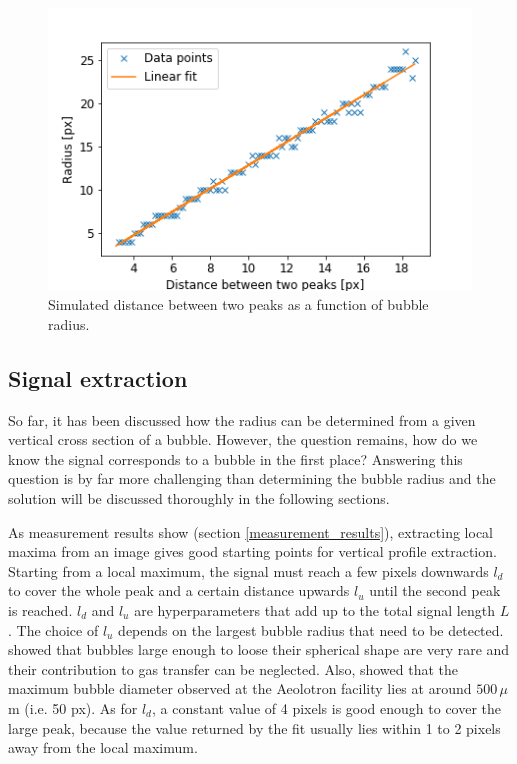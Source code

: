 		\begin{figure}
			\centering
			\includegraphics[scale=.6]{graphs/peak_distance_radius_fit.png}
			\caption{Simulated distance between two peaks as a function of bubble radius.}
			\label{fig:peaks_radius_fit}
		\end{figure}
	
	
	
	\subsection{Signal extraction}\label{signal_extraction}
		So far, it has been discussed how the radius can be determined from a given vertical cross section of a bubble. However, the question remains, how do we know the signal corresponds to a bubble in the first place? Answering this question is by far more challenging than determining the bubble radius and the solution will be discussed thoroughly in the following sections. 
		
		As measurement results show (section \ref{measurement_results}), extracting local maxima from an image gives good starting points for vertical profile extraction. Starting from a local maximum, the signal must reach a few pixels downwards $l_{d}$ to cover the whole peak and a certain distance upwards $l_u$ until the second peak is reached. $l_d$ and $l_u$ are hyperparameters that add up to the total signal length $L$. The choice of $l_u$ depends on the largest bubble radius that need to be detected. \citet{Al-Lashi2016} showed that bubbles large enough to loose their spherical shape are very rare and their contribution to gas transfer can be neglected. Also, \citet{Leonie} showed that the maximum bubble diameter observed at the Aeolotron facility lies at around $500 \, \mu$m (i.e. 50 px). As for $l_d$, a constant value of 4 pixels is good enough to cover the large peak, because the value returned by the fit usually lies within 1 to 2 pixels away from the local maximum. 	
	
